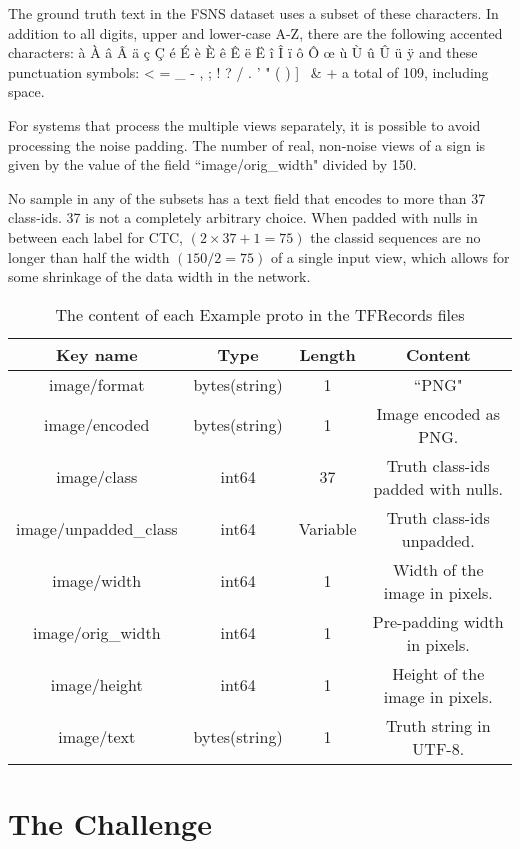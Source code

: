 \documentclass[runningheads]{llncs}
\begin{document}
The ground truth text in the FSNS dataset uses a subset of these characters. In addition to all digits,
upper and lower-case A-Z, there are the following accented characters:
à
À
â
Â
ä
ç
Ç
é
É
è
È
ê
Ê
ë
Ë
î
Î
ï
ô
Ô
œ
ù
Ù
û
Û
ü
ÿ
and these punctuation symbols:
\textless
=
\_
-
,
;
!
?
/
.
'
"
(
)
]
\
\&
+
 a total of 109, including space.

For systems that process the multiple views separately, it is possible to avoid processing the noise padding. The number of real, non-noise views of a sign is given by the value of
the field ``image/orig\_width" divided by 150.

No sample in any of the subsets has a text field that encodes to more than 37 class-ids.
 37 is not a completely arbitrary choice. When padded with nulls in between each label for CTC,
 $(2\times37+1=75)$ the classid sequences are no longer than half the width $(150/2=75)$ of a single
 input view, which allows for some shrinkage of the data width in the network.

\begin{table}
\begin{center}
\caption{The content of each Example proto in the TFRecords files}
\label{table:tfspec}
{\scriptsize
\begin{tabulary}{\linewidth}{| c | c | c | C |}
\hline
Key name		& Type 		& Length   & Content \\ \hline \hline
image/format  	& bytes(string) & 1 	   & ``PNG" \\ \hline 
image/encoded 	& bytes(string) & 1	   & Image encoded as PNG. \\ \hline 
image/class   	& int64		& 37	   & Truth class-ids padded with nulls. \\ \hline
image/unpadded\_class & int64		& Variable & Truth class-ids unpadded. \\ \hline
image/width		& int64		& 1	   & Width of the image in pixels. \\ \hline
image/orig\_width	& int64		& 1  	   & Pre-padding width in pixels. \\ \hline 
image/height		& int64		& 1	   & Height of the image in pixels. \\ \hline
image/text		& bytes(string)	& 1	   & Truth string in UTF-8.\\ \hline
\end{tabulary}
} 
\end{center} 
\end{table}


\section{The Challenge}\label{challenge}
\end{document}

